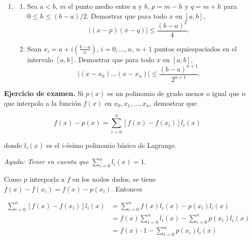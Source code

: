 \documentclass[12pt]{article}
\begin{document}
\begin{myframe}
    \begin{enumerate}
    \item[8.] 
    \begin{enumerate}
        \item[a)] Sea $a < b$, $m$ el punto medio entre $a$ y $b$, $p = m - h$ y $q = m + h$ para $0 \leq h \leq (b - a)/2$. Demostrar que para todo $x$ en $[a, b]$,
        \begin{equation*}
            |(x - p)(x - q)| \leq \frac{(b - a)^2}{4}.
        \end{equation*}
        
        \item[b)] Sean $x_i = a + i \left( \frac{b - a}{n} \right)$, $i = 0, \dots, n$, $n + 1$ puntos equiespaciados en el intervalo $[a, b]$. Demostrar que para todo $x$ en $[a, b]$,
        \begin{equation*}
            |(x - x_0) \dots (x - x_n)| \leq \frac{(b - a)^{n+1}}{2^{n+1}}.
        \end{equation*}
    \end{enumerate}
\end{enumerate}
\end{myframe}

\pagebreak 

\begin{myframe}
    \textbf{Ejercicio de examen.} Si $p(x)$ es un polinomio de grado menor o igual que $n$ que interpola a la función $f(x)$ en $x_0, x_1, \dots, x_n$, demostrar que

$$f(x) - p(x) = \sum_{i=0}^{n} [f(x) - f(x_i)] l_i(x)$$

donde $l_i(x)$ es el $i$-ésimo polinomio básico de Lagrange.

\textit{Ayuda: Tener en cuenta que} $\displaystyle \sum_{i=0}^{n} l_i(x) = 1$.

\end{myframe}

Como $p$ interporla a $f$ en los nodos dados, se tiene $f(x) - f(x_i) = f(x) -
p(x_i)$. Entonces 

\begin{align*}
    \sum_{i=0}^n \left[ f(x) - f(x_i) \right] l_i(x)  
    &= \sum_{i=0}^n f(x) l_i(x) - p(x_i) l_i(x) \\ 
    &= f(x) \sum_{i=0}^n l_i(x) - \sum_{i=0}^n p(x_i)l_i(x) \\ 
    &= f(x) \cdot 1 - \sum_{i=0}^n p(x_i)l_i(x)
\end{align*}
\end{document}
